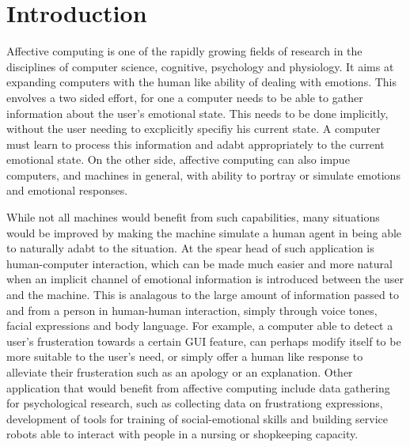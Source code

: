 \documentclass[12pt, a4paper, fleqn]{memoir}%
\begin{document}
\mainmatter

\chapter{Introduction}
\label{chap:Introduction}
Affective computing is one of the rapidly growing fields of research in the disciplines of computer science, cognitive, psychology and physiology\cite{tao2005affective}. It aims at expanding computers with the human like ability of dealing with emotions. This envolves a two sided effort, for one a computer needs to be able to gather information about the user's emotional state. This needs to be done implicitly, without the user needing to excplicitly specifiy his current state. A computer must learn to process this information and adabt appropriately to the current emotional state. On the other side, affective computing can also impue computers, and machines in general, with ability to portray or simulate emotions and emotional responses\cite{picard2003affective, picard1999affective}. 

While not all machines would benefit from such capabilities, many situations would be improved by making the machine simulate a human agent in being able to naturally adabt to the situation\cite{picard1999affective}. At the spear head of such application is human-computer interaction, which can be made much easier and more natural when an implicit channel of emotional information is introduced between the user and the machine. This is analagous to the large amount of information passed to and from a person in human-human interaction, simply through voice tones, facial expressions and body language\cite{cowie2001emotion}. For example, a computer able to detect a user's frusteration towards a certain GUI feature, can perhaps modify itself to be more suitable to the user's need, or simply offer a human like response to alleviate their frusteration such as an apology or an explanation. Other application that would benefit from affective computing include data gathering for psychological research, such as collecting data on frustrationg expressions, development of tools for training of social-emotional skills and building service robots able to interact with people in a nursing or shopkeeping capacity\cite{picard1999affective}.
\end{document}

